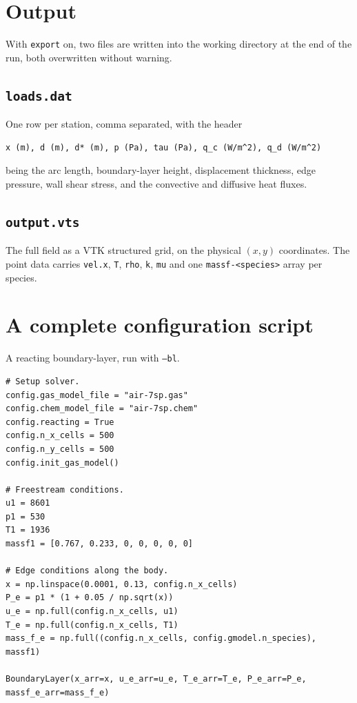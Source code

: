 \documentclass[10pt,a4paper]{article}
\renewcommand{\_}{\origunderscore\penalty4000\relax}
\begin{document}
\section*{Output}

With \texttt{export} on, two files are written into the working directory at the end of the run, both overwritten without warning.

\subsection*{\texttt{loads.dat}}

One row per station, comma separated, with the header
\begin{lstlisting}[style=plain]
x (m), d (m), d* (m), p (Pa), tau (Pa), q_c (W/m^2), q_d (W/m^2)
\end{lstlisting}

being the arc length, boundary-layer height, displacement thickness, edge pressure, wall shear stress, and the convective and diffusive heat fluxes.

\subsection*{\texttt{output.vts}}

The full field as a VTK structured grid, on the physical $(x, y)$ coordinates. The point data carries \texttt{vel.x}, \texttt{T}, \texttt{rho}, \texttt{k}, \texttt{mu} and one \texttt{massf-<species>} array per species.

\section*{A complete configuration script}

A reacting boundary-layer, run with \texttt{--bl}.

\begin{lstlisting}
# Setup solver.
config.gas_model_file = "air-7sp.gas"
config.chem_model_file = "air-7sp.chem"
config.reacting = True
config.n_x_cells = 500
config.n_y_cells = 500
config.init_gas_model()

# Freestream conditions.
u1 = 8601
p1 = 530
T1 = 1936
massf1 = [0.767, 0.233, 0, 0, 0, 0, 0]

# Edge conditions along the body.
x = np.linspace(0.0001, 0.13, config.n_x_cells)
P_e = p1 * (1 + 0.05 / np.sqrt(x))
u_e = np.full(config.n_x_cells, u1)
T_e = np.full(config.n_x_cells, T1)
mass_f_e = np.full((config.n_x_cells, config.gmodel.n_species), massf1)

BoundaryLayer(x_arr=x, u_e_arr=u_e, T_e_arr=T_e, P_e_arr=P_e, massf_e_arr=mass_f_e)
\end{lstlisting}
\end{document}
